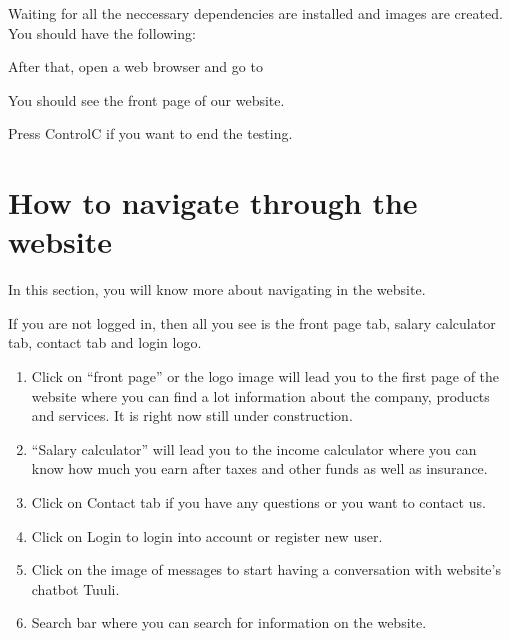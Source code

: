 \documentclass[letterpaper,10pt,english]{sphinxmanual}
\begin{document}
\sphinxAtStartPar
Waiting for all the neccessary dependencies are installed and images are created. You should have the following:

\noindent{}

\sphinxAtStartPar
After that, open a web browser and go to 

\sphinxAtStartPar
You should see the front page of our website.

\noindent{}

\sphinxAtStartPar
Press Control\sphinxhyphen{}C if you want to end the testing.

\sphinxstepscope


\chapter{How to navigate through the website}
\label{\detokenize{pages/navigation-bar:how-to-navigate-through-the-website}}\label{\detokenize{pages/navigation-bar::doc}}
\sphinxAtStartPar
In this section, you will know more about navigating in the website.

\sphinxAtStartPar
If you are not logged in, then all you see is the front page tab, salary calculator tab, contact tab and login logo.

\noindent{}
\begin{enumerate}
%
\item {} 
\sphinxAtStartPar
Click on “front page” or the logo image  will lead you to the first page of the website where you can find a lot information about the company, products and services. It is right now still under construction.

\item {} 
\sphinxAtStartPar
“Salary calculator” will lead you to the income calculator where you can know how much you earn after taxes and other funds as well as insurance.

\item {} 
\sphinxAtStartPar
Click on Contact tab if you have any questions or you want to contact us.

\item {} 
\sphinxAtStartPar
Click on Login to login into account or register new user.

\item {} 
\sphinxAtStartPar
Click on the image of messages to start having a conversation with website’s chatbot Tuuli.

\item {} 
\sphinxAtStartPar
Search bar where you can search for information on the website.

\end{enumerate}
\end{document}
